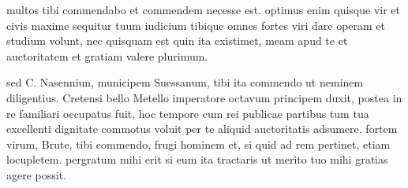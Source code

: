 


 multos tibi commendabo et commendem necesse est. optimus enim quisque vir et civis maxime sequitur tuum iudicium tibique omnes fortes viri dare operam et studium volunt, nec quisquam est quin ita existimet, meam apud te et auctoritatem et gratiam valere plurimum.

 sed C. Nasenniun, municipem Suessanum, tibi ita commendo ut neminem diligentius. Cretensi bello Metello imperatore octavum principem duxit, postea in re familiari occupatus fuit, hoc tempore cum rei publicae partibus tum tua excellenti dignitate commotus voluit per te aliquid auctoritatis adsumere. fortem virum, Brute, tibi commendo, frugi hominem et, si quid ad rem pertinet, etiam locupletem. pergratum mihi erit si eum ita tractaris ut merito tuo mihi gratias agere possit.
